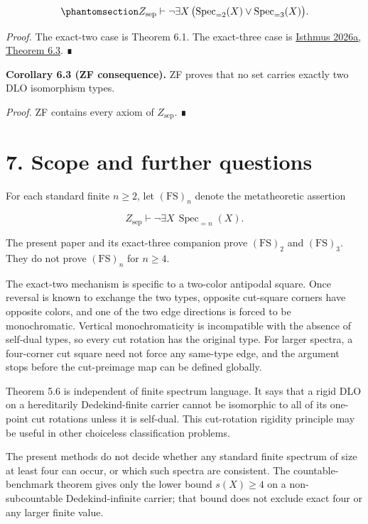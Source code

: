 \documentclass[
  english,
  11pt,
  reqno]{amsart}
\begin{document}
\begin{equation}\protect\phantomsection\label{eq:two-three-gap}{
Z_{\mathrm{sep}}
\vdash
\neg\exists X\,
\bigl(
\operatorname{Spec}_{=2}(X)
\vee
\operatorname{Spec}_{=3}(X)
\bigr).
}\end{equation}

\emph{Proof.} The exact-two case is Theorem 6.1. The exact-three case is
\hyperref[ref:isthmus2026a]{Isthmus 2026a, Theorem 6.3}. ∎

\protect{}\label{cor:6-3-zf}

\textbf{Corollary 6.3 (ZF consequence).} ZF proves that no set carries
exactly two DLO isomorphism types.

\emph{Proof.} ZF contains every axiom of \(Z_{\mathrm{sep}}\). ∎

\protect{}\label{sec:scope}

\section{7. Scope and further
questions}\label{scope-and-further-questions}

For each standard finite \(n\ge2\), let \((\mathrm{FS})_n\) denote the
metatheoretic assertion

\[
Z_{\mathrm{sep}}
\vdash
\neg\exists X\,
\operatorname{Spec}_{=n}(X).
\]

The present paper and its exact-three companion prove
\((\mathrm{FS})_2\) and \((\mathrm{FS})_3\). They do not prove
\((\mathrm{FS})_n\) for \(n\ge4\).

The exact-two mechanism is specific to a two-color antipodal square.
Once reversal is known to exchange the two types, opposite cut-square
corners have opposite colors, and one of the two edge directions is
forced to be monochromatic. Vertical monochromaticity is incompatible
with the absence of self-dual types, so every cut rotation has the
original type. For larger spectra, a four-corner cut square need not
force any same-type edge, and the argument stops before the cut-preimage
map can be defined globally.

Theorem 5.6 is independent of finite spectrum language. It says that a
rigid DLO on a hereditarily Dedekind-finite carrier cannot be isomorphic
to all of its one-point cut rotations unless it is self-dual. This
cut-rotation rigidity principle may be useful in other choiceless
classification problems.

The present methods do not decide whether any standard finite spectrum
of size at least four can occur, or which such spectra are consistent.
The countable-benchmark theorem gives only the lower bound \(s(X)\ge4\)
on a non-subcountable Dedekind-infinite carrier; that bound does not
exclude exact four or any larger finite value.
\end{document}
